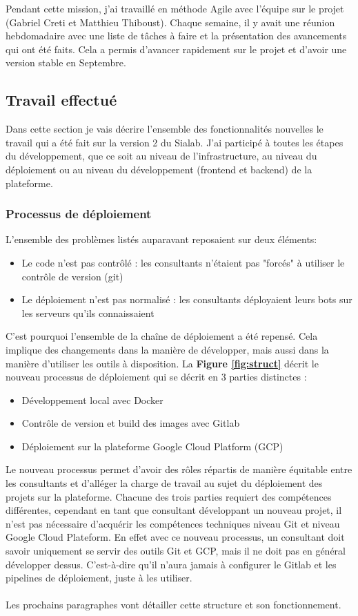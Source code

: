 \documentclass{article} %
\begin{document}
Pendant cette mission, j'ai travaillé en méthode Agile avec l'équipe sur le projet (Gabriel Creti et Matthieu Thiboust). Chaque semaine, il y avait une réunion hebdomadaire avec une liste de tâches à faire et la présentation des avancements qui ont été faits. Cela a permis d'avancer rapidement sur le projet et d'avoir une version stable en Septembre.

\subsection{Travail effectué}
Dans cette section je vais décrire l'ensemble des fonctionnalités nouvelles le travail qui a été fait sur la version 2 du Sialab. J'ai participé à toutes les étapes du développement, que ce soit au niveau de l'infrastructure, au niveau du déploiement ou au niveau du développement (frontend et backend) de la plateforme.

\subsubsection{Processus de déploiement}

L'ensemble des problèmes listés auparavant reposaient sur deux éléments:
\begin{itemize}
 \item Le code n'est pas contrôlé : les consultants n'étaient pas "forcés" à utiliser le contrôle de version (git)
 \item Le déploiement n'est pas normalisé : les consultants déployaient leurs bots sur les serveurs qu'ils connaissaient
\end{itemize}
C'est pourquoi l'ensemble de la chaîne de déploiement a été repensé. Cela implique des changements dans la manière de développer, mais aussi dans la manière d'utiliser les outils à disposition. La \textbf{Figure \ref{fig:struct}} décrit le nouveau processus de déploiement qui se décrit en 3 parties distinctes :
\begin{itemize}
 \item Développement local avec Docker
 \item Contrôle de version et build des images avec Gitlab
 \item Déploiement sur la plateforme Google Cloud Platform (GCP)
\end{itemize}
Le nouveau processus permet d'avoir des rôles répartis de manière équitable entre les consultants et d'alléger la charge de travail au sujet du déploiement des projets sur la plateforme. Chacune des trois parties requiert des compétences différentes, cependant en tant que consultant développant un nouveau projet, il n'est pas nécessaire d'acquérir les compétences techniques niveau Git et niveau Google Cloud Plateform. En effet avec ce nouveau processus, un consultant doit savoir uniquement se servir des outils Git et GCP, mais il ne doit pas en général développer dessus. C'est-à-dire qu'il n'aura jamais à configurer le Gitlab et les pipelines de déploiement, juste à les utiliser.\\ \\
Les prochains paragraphes vont détailler cette structure et son fonctionnement.
\newpage
\end{document}
